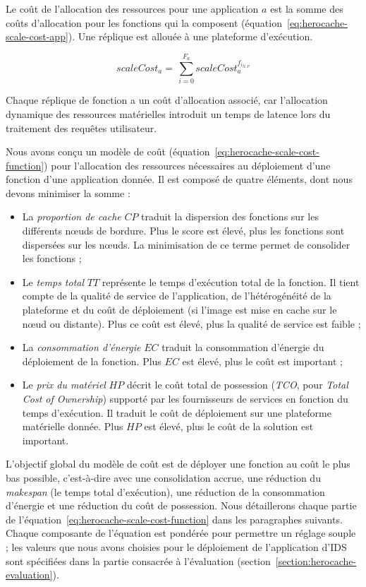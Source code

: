 Le coût de l'allocation des ressources pour une application $a$ est la somme des coûts d'allocation pour les fonctions qui la composent (équation~\ref{eq:herocache-scale-cost-app}). Une réplique est allouée à une plateforme d'exécution.

\begin{equation}
    scaleCost_{a} = \, \sum_{i = 0}^{F_{a}} scaleCost^{{f}_{{i}_{N, P}}}_a
\label{eq:herocache-scale-cost-app}
\end{equation}

Chaque réplique de fonction a un coût d'allocation associé, car l'allocation dynamique des ressources matérielles introduit un temps de latence lors du traitement des requêtes utilisateur.

Nous avons conçu un modèle de coût (équation~\ref{eq:herocache-scale-cost-function}) pour l'allocation des ressources nécessaires au déploiement d'une fonction d'une application donnée. Il est composé de quatre éléments, dont nous devons minimiser la somme :

\begin{itemize}
    \item La \textit{proportion de cache} $CP$ traduit la dispersion des fonctions sur les différents nœuds de bordure. Plus le score est élevé, plus les fonctions sont dispersées sur les nœuds. La minimisation de ce terme permet de consolider les fonctions ;
    \item Le \textit{temps total} $TT$ représente le temps d'exécution total de la fonction. Il tient compte de la qualité de service de l'application, de l'hétérogénéité de la plateforme et du coût de déploiement (si l'image est mise en cache sur le nœud ou distante). Plus ce coût est élevé, plus la qualité de service est faible ;
    \item La \textit{consommation d'énergie} $EC$ traduit la consommation d'énergie du déploiement de la fonction. Plus $EC$ est élevé, plus le coût est important ;
    \item Le \textit{prix du matériel} $HP$ décrit le coût total de possession (\textit{TCO}, pour \textit{Total Cost of Ownership}) supporté par les fournisseurs de services en fonction du temps d'exécution. Il traduit le coût de déploiement sur une plateforme matérielle donnée. Plus $HP$ est élevé, plus le coût de la solution est important.
\end{itemize}

L'objectif global du modèle de coût est de déployer une fonction au coût le plus bas possible, c'est-à-dire avec une consolidation accrue, une réduction du \textit{makespan} (le temps total d'exécution), une réduction de la consommation d'énergie et une réduction du coût de possession. Nous détaillerons chaque partie de l'équation~\ref{eq:herocache-scale-cost-function} dans les paragraphes suivants. Chaque composante de l'équation est pondérée pour permettre un réglage souple ; les valeurs que nous avons choisies pour le déploiement de l'application d'IDS sont spécifiées dans la partie consacrée à l'évaluation (section~\ref{section:herocache-evaluation}).


